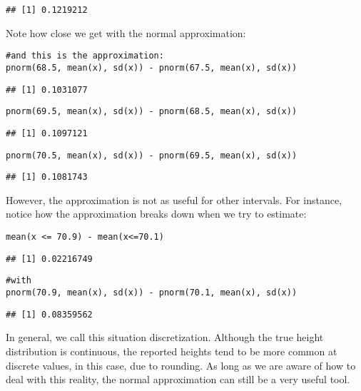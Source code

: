 \documentclass[
]{article}
\begin{document}
\begin{verbatim}
## [1] 0.1219212
\end{verbatim}

Note how close we get with the normal approximation:

\begin{verbatim}
#and this is the approximation:
pnorm(68.5, mean(x), sd(x)) - pnorm(67.5, mean(x), sd(x)) 
\end{verbatim}

\begin{verbatim}
## [1] 0.1031077
\end{verbatim}

\begin{verbatim}
pnorm(69.5, mean(x), sd(x)) - pnorm(68.5, mean(x), sd(x)) 
\end{verbatim}

\begin{verbatim}
## [1] 0.1097121
\end{verbatim}

\begin{verbatim}
pnorm(70.5, mean(x), sd(x)) - pnorm(69.5, mean(x), sd(x)) 
\end{verbatim}

\begin{verbatim}
## [1] 0.1081743
\end{verbatim}

However, the approximation is not as useful for other intervals. For
instance, notice how the approximation breaks down when we try to
estimate:

\begin{verbatim}
mean(x <= 70.9) - mean(x<=70.1)
\end{verbatim}

\begin{verbatim}
## [1] 0.02216749
\end{verbatim}

\begin{verbatim}
#with
pnorm(70.9, mean(x), sd(x)) - pnorm(70.1, mean(x), sd(x))
\end{verbatim}

\begin{verbatim}
## [1] 0.08359562
\end{verbatim}

In general, we call this situation discretization. Although the true
height distribution is continuous, the reported heights tend to be more
common at discrete values, in this case, due to rounding. As long as we
are aware of how to deal with this reality, the normal approximation can
still be a very useful tool.
\end{document}
